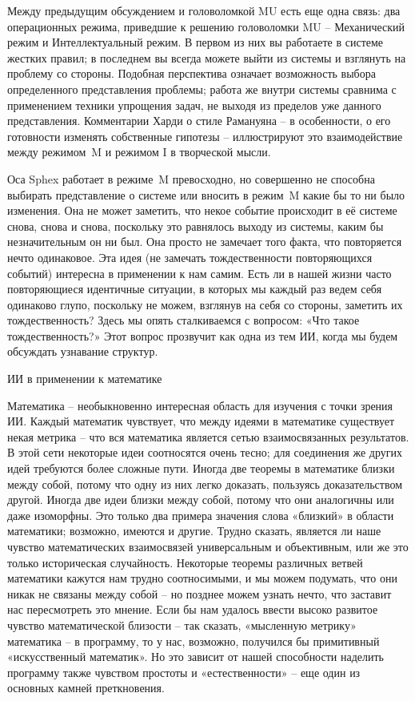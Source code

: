 \documentclass[../main.tex]{subfiles}
\begin{document}
Между предыдущим обсуждением и головоломкой MU есть еще одна связь: два операционных режима, приведшие к решению головоломки MU \--- Механический режим и Интеллектуальный режим. В первом из них вы работаете в системе жестких правил; в последнем вы всегда можете выйти из системы и взглянуть на проблему со стороны. Подобная перспектива означает возможность выбора определенного представления проблемы; работа же внутри системы сравнима с применением техники упрощения задач, не выходя из пределов уже данного представления. Комментарии Харди о стиле Рамануяна \--- в особенности, о его готовности изменять собственные гипотезы \--- иллюстрируют это взаимодействие между режимом~M и режимом I в творческой мысли.

Оса Sphex работает в режиме~M превосходно, но совершенно не способна выбирать представление о системе или вносить в режим~M какие бы то ни было изменения. Она не может заметить, что некое событие происходит в её системе снова, снова и снова, поскольку это равнялось выходу из системы, каким бы незначительным он ни был. Она просто не замечает того факта, что повторяется нечто одинаковое. Эта идея (не замечать тождественности повторяющихся событий) интересна в применении к нам самим. Есть ли в нашей жизни часто повторяющиеся идентичные ситуации, в которых мы каждый раз ведем себя одинаково глупо, поскольку не можем, взглянув на себя со стороны, заметить их тождественность? Здесь мы опять сталкиваемся с вопросом: «Что такое тождественность?» Этот вопрос прозвучит как одна из тем ИИ, когда мы будем обсуждать узнавание структур.

ИИ в применении к математике

Математика \--- необыкновенно интересная область для изучения с точки зрения ИИ\@. Каждый математик чувствует, что между идеями в математике существует некая метрика \--- что вся математика является сетью взаимосвязанных результатов. В этой сети некоторые идеи соотносятся очень тесно; для соединения же других идей требуются более сложные пути. Иногда две теоремы в математике близки между собой, потому что одну из них легко доказать, пользуясь доказательством другой. Иногда две идеи близки между собой, потому что они аналогичны или даже изоморфны. Это только два примера значения слова «близкий» в области математики; возможно, имеются и другие. Трудно сказать, является ли наше чувство математических взаимосвязей универсальным и объективным, или же это только историческая случайность. Некоторые теоремы различных ветвей математики кажутся нам трудно соотносимыми, и мы можем подумать, что они никак не связаны между собой \--- но позднее можем узнать нечто, что заставит нас пересмотреть это мнение. Если бы нам удалось ввести высоко развитое чувство математической близости \--- так сказать, «мысленную метрику» математика \--- в программу, то у нас, возможно, получился бы примитивный «искусственный математик». Но это зависит от нашей способности наделить программу также чувством простоты и «естественности» \--- еще один из основных камней преткновения.
\end{document}
